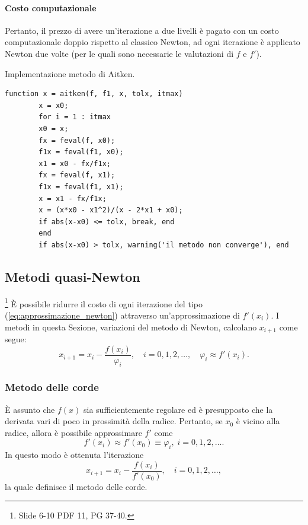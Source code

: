 \paragraph{Costo computazionale} Pertanto, il prezzo di avere un'iterazione a due livelli è pagato con un costo computazionale doppio rispetto al classico Newton, ad ogni iterazione è applicato Newton due volte (per le quali sono necessarie le valutazioni di $f$ e $f'$).

\begin{algorithm}
	\caption{Implementazione metodo di Aitken.}\label{alg:metAit}
	\begin{lstlisting}[style=Matlab-editor]
		function x = aitken(f, f1, x, tolx, itmax)
		x = x0;
		for i = 1 : itmax
		x0 = x;
		fx = feval(f, x0);
		f1x = feval(f1, x0);
		x1 = x0 - fx/f1x;
		fx = feval(f, x1);
		f1x = feval(f1, x1);
		x = x1 - fx/f1x;
		x = (x*x0 - x1^2)/(x - 2*x1 + x0);
		if abs(x-x0) <= tolx, break, end
		end
		if abs(x-x0) > tolx, warning('il metodo non converge'), end
	\end{lstlisting}
\end{algorithm}

\subsection{Metodi quasi-Newton}
\footnote{Slide 6-10 PDF 11, PG 37-40.}
È possibile ridurre il costo di ogni iterazione del tipo (\ref{eq:approssimazione_newton}) attraverso un'approssimazione di $f'(x_i)$. I metodi in questa Sezione, variazioni del metodo di Newton, calcolano $x_{i+1}$ come segue:
\begin{equation}\label{eq:approssimazione_quasi_newton}
	x_{i+1}=x_i-\frac{f(x_i)}{\varphi_i}, \quad i=0,1,2,\hdots, \quad\varphi_i\approx f'(x_i).
\end{equation}

\subsubsection{Metodo delle corde}\label{sssec:metodo_corde}
È assunto che $f(x)$ sia sufficientemente regolare ed è presupposto che la derivata vari di poco in prossimità della radice.
Pertanto, se $x_0$ è vicino alla radice, allora è possibile approssimare $f'$ come
\begin{equation*}
	f'(x_i)\approx f'(x_0)\equiv\varphi_i,\; i=0,1,2,\hdots.
\end{equation*}
In questo modo è ottenuta l'iterazione 
\begin{equation}\label{eq:approxCorde}
	x_{i+1}=x_i-\frac{f(x_i)}{f'(x_0)}, \quad i=0,1,2,\hdots,
\end{equation}
la quale definisce il metodo delle corde.

